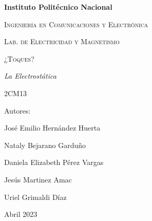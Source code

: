 \documentclass[10pt]{article}
\begin{document}
\lhead{}
\begin{titlepage}
	\begin{figure}[t]
		\hspace{0.6\textwidth}
	\end{figure}
	\centering
	{\bfseries\Huge Instituto Politécnico Nacional \par}
	\vspace{1cm}
	{\scshape\Large Ingeniería en Comunicaciones y Electrónica \par}
	\vspace{0.3cm}
	{\scshape\Large Lab. de Electricidad y Magnetismo  \par}
	\vspace{1cm}
	{\scshape\Huge ¿Toques? \par}
	\vspace{1cm}
	{\itshape\Large La Electrostática\par}
	{\Large 2CM13\par}
	\vfill
	{\Large Autores: \par}
	{\Large José Emilio Hernández Huerta \par}
	{\Large Nataly Bejarano Garduño \par}
	{\Large Daniela Elizabeth Pérez Vargas \par}
	{\Large Jesús Martinez Amac\par}
	{\Large Uriel Grimaldi Díaz  \par}
	\vfill
	{\Large Abril 2023 \par}
\end{titlepage}
\tableofcontents

\newpage
\end{document}
